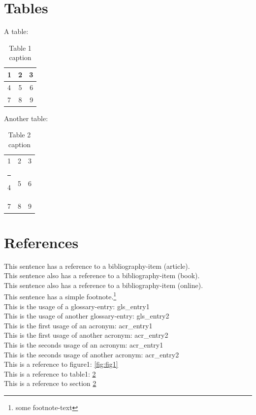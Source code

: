 \documentclass{report}
\makeatletter
\newcommand{\thickhline}{
    \noalign {\ifnum 0=`}\fi \hrule height 1pt
    \futurelet \reserved@a \@xhline
}
\makeatother
\begin{document}
\section{Tables}
A table:
\begin{table}[H]
    \centering
    \begin{tabular}{ | l | c | r | }\hline
        1 & 2 & 3 \\\hline
        4 & 5 & 6 \\\hline
        7 & 8 & 9 \\\hline
    \end{tabular}
    \caption{Table 1 caption}\label{tab:tab1}
\end{table}
Another table:
\begin{table}[H]
    \centering
    \begin{tabular}{ | l | c | r | }\hline
        1 & 2 & 3 \\\thickhline
        4 & 5 & 6 \\\hline
        7 & 8 & 9 \\\hline
    \end{tabular}
    \caption{Table 2 caption}\label{tab:tab2}
\end{table}

\section{References}\label{sec:ref}
This sentence has a reference to a bibliography-item (article).\cite{ein1}\\
This sentence also has a reference to a bibliography-item (book).\cite{gam1}\\
This sentence also has a reference to a bibliography-item (online).\cite{sho1}\\
This sentence has a simple footnote.\footnote{some footnote-text}\\
This is the usage of a glossary-entry: \gls{gls_entry1}\\
This is the usage of another glossary-entry: \gls{gls_entry2}\\
This is the first usage of an acronym: \gls{acr_entry1}\\
This is the first usage of another acronym: \gls{acr_entry2}\\
This is the seconds usage of an acronym: \gls{acr_entry1}\\
This is the seconds usage of another acronym: \gls{acr_entry2}\\
This is a reference to figure1: \ref{fig:fig1}\\
This is a reference to table1: \ref{tab:tab2}\\
This is a reference to section \ref{sec:ref}\\
\end{document}
